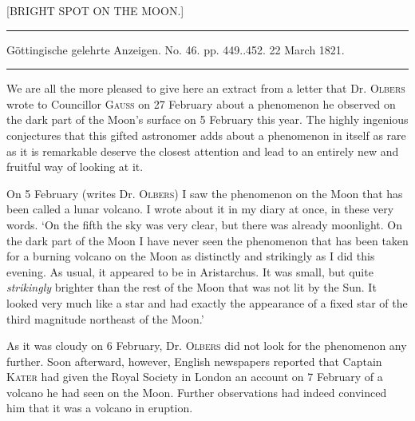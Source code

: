 \clearpage
{}
\begin{center}
{\large [BRIGHT SPOT ON THE MOON.]}
\end{center}

\begin{center}
\noindent\rule{\linewidth}{0.4pt}

Göttingische gelehrte Anzeigen. No. 46. pp. 449..452. 22 March 1821.

\noindent\rule{\linewidth}{0.4pt}
\end{center}

We are all the more pleased to give here an extract from a letter that Dr. \textsc{Olbers} wrote to Councillor \textsc{Gauss} on 27 February about a phenomenon he observed on the dark part of the Moon’s surface on 5 February this year. The highly ingenious conjectures that this gifted astronomer adds about a phenomenon in itself as rare as it is remarkable deserve the closest attention and lead to an entirely new and fruitful way of looking at it.

On 5 February (writes Dr. \textsc{Olbers}) I saw the phenomenon on the Moon that has been called a lunar volcano. I wrote about it in my diary at once, in these very words. `On the fifth the sky was very clear, but there was already moonlight. On the dark part of the Moon I have never seen the phenomenon that has been taken for a burning volcano on the Moon as distinctly and strikingly as I did this evening. As usual, it appeared to be in Aristarchus. It was small, but quite \emph{strikingly} brighter than the rest of the Moon that was not lit by the Sun. It looked very much like a star and had exactly the appearance of a fixed star of the third magnitude northeast of the Moon.'

As it was cloudy on 6 February, Dr. \textsc{Olbers} did not look for the phenomenon any further. Soon afterward, however, English newspapers reported that Captain \textsc{Kater} had given the Royal Society in London an account on 7 February of a volcano he had seen on the Moon. Further observations had indeed convinced him that it was a volcano in eruption.

